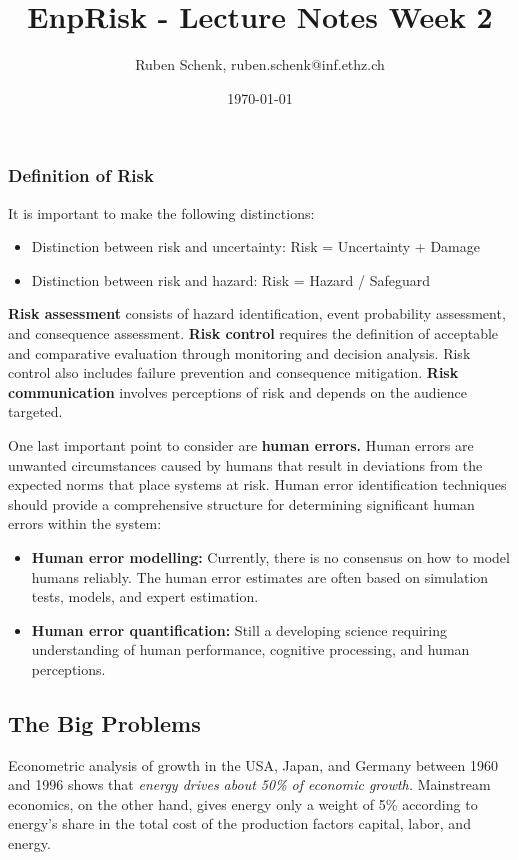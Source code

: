 \documentclass[a4paper]{extarticle}
\title{EnpRisk - Lecture Notes Week 2}
\author{Ruben Schenk, ruben.schenk@inf.ethz.ch}
\date{\today}
\begin{document}
\maketitle
\newpage

\subsubsection{Definition of Risk}

It is important to make the following distinctions:

\begin{itemize}
    \item Distinction between risk and uncertainty: Risk = Uncertainty + Damage
    \item Distinction between risk and hazard: Risk = Hazard / Safeguard
\end{itemize}

\textbf{Risk assessment} consists of hazard identification, event probability assessment, and consequence assessment. \textbf{Risk control} requires the definition of acceptable and comparative evaluation through monitoring and decision analysis. Risk control also includes failure prevention and consequence mitigation. \textbf{Risk communication} involves perceptions of risk and depends on the audience targeted.

One last important point to consider are \textbf{human errors.} Human errors are unwanted circumstances caused by humans that result in deviations from the expected norms that place systems at risk. Human error identification techniques should provide a comprehensive structure for determining significant human errors within the system:

\begin{itemize}
    \item \textbf{Human error modelling:} Currently, there is no consensus on how to model humans reliably. The human error estimates are often based on simulation tests, models, and expert estimation.
    \item \textbf{Human error quantification:} Still a developing science requiring understanding of human performance, cognitive processing, and human perceptions.
\end{itemize}

\subsection{The Big Problems}

Econometric analysis of growth in the USA, Japan, and Germany between 1960 and 1996 shows that \textit{energy drives about 50\% of economic growth.} Mainstream economics, on the other hand, gives energy only a weight of 5\% according to energy's share in the total cost of the production factors capital, labor, and energy.
\end{document}
